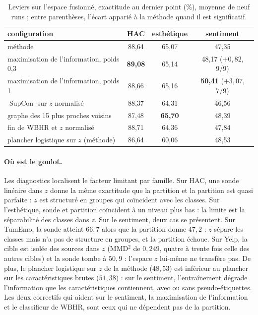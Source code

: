 \documentclass[11pt,a4paper]{article}
\theoremstyle{definition}
\theoremstyle{remark}
\DeclareMathOperator{\SupCon}{SupCon}
\begin{document}
\begin{table}[ht]
\centering
\caption{Leviers sur l'espace fusionné, exactitude au dernier point ($\%$), moyenne de neuf runs ; entre parenthèses,
  l'écart apparié à la méthode quand il est significatif.}\label{tab-leviers}
\small
\begin{tabular}{lccc}
\toprule
configuration & HAC & esthétique & sentiment \\
\midrule
méthode & 88,64 & 65,07 & 47,35 \\
maximisation de l'information, poids 0,3 & \textbf{89,08} & 65,14 & 48,17 ($+0{,}82$, 9/9) \\
maximisation de l'information, poids 1 & 88,66 & 65,16 & \textbf{50,41} ($+3{,}07$, 7/9) \\
$\SupCon$ sur $z$ normalisé & 88,37 & 64,31 & 46,56 \\
graphe des 15 plus proches voisins & 87,48 & \textbf{65,70} & 48,39 \\
fin de WBHR et $z$ normalisé & 88,71 & 64,36 & 47,84 \\
\midrule
plancher logistique sur $z$ (méthode) & 86,64 & 60,06 & 48,53 \\
\bottomrule
\end{tabular}
\end{table}

\paragraph{Où est le goulot.}
Les diagnostics localisent le facteur limitant par famille. Sur HAC, une sonde linéaire dans $z$ donne la même exactitude
que la partition et la partition est quasi parfaite : $z$ est structuré en groupes qui coïncident avec les classes. Sur
l'esthétique, sonde et partition coïncident à un niveau plus bas : la limite est la séparabilité des classes dans $z$.
Sur le sentiment, deux cas se présentent. Sur TumEmo, la sonde atteint $66{,}7$ alors que la partition donne $47{,}2$ :
$z$ sépare les classes mais n'a pas de structure en groupes, et la partition échoue. Sur Yelp, la cible est isolée des
sources dans $z$ (MMD$^2$ de $0{,}249$, quatre à trente fois celle des autres cibles) et la sonde tombe à $50{,}9$ :
l'espace $z$ lui-même ne transfère pas. De plus, le plancher logistique sur $z$ de la méthode ($48{,}53$) est inférieur au
plancher sur les caractéristiques brutes ($51{,}38$) : sur le sentiment, l'entraînement dégrade l'information que les
caractéristiques contiennent, avec ou sans pseudo-étiquettes. Les deux correctifs qui aident sur le sentiment, la
maximisation de l'information et le classifieur de WBHR, sont ceux qui ne dépendent pas de la partition.
\end{document}
